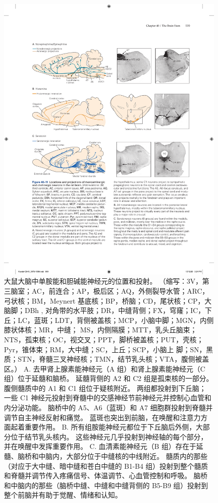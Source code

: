 \begin{figure}[htbp]
	\centering
	\includegraphics[width=0.95\linewidth]{chap40/fig_40_11}
	\caption{大鼠大脑中单胺能和胆碱能神经元的位置和投射。 （缩写：3V，第三脑室；AC，前连合；AP，极后区；AQ，外侧裂导水管；ARC，弓状核；BM，Meynert 基底核；BP，桥脑；CD，尾状核；CP，大脑脚；DBh , 对角带的水平肢；DR，中缝背侧；FX，穹窿；IC，下丘；LC，蓝斑；LDT，背侧被盖核；MCP，小脑中脚；MGN，内侧膝状体核；MR，中缝； MS，内侧隔膜；MTT，乳头丘脑束；NTS，孤束核；OC，视交叉；PPT，脚桥被盖核；PUT，壳核；Pyr，锥体束；RM，大中缝；SC，上丘；SCP，小脑上 脚；SN，黑质；STN，脊髓三叉神经核；TMN，结节乳头核；VTA，腹侧被盖区。） A. 去甲肾上腺素能神经元（A 组）和肾上腺素能神经元（C 组）位于延髓和脑桥。 延髓背侧的 A2 和 C2 组是孤束核的一部分。 腹侧髓质中的 A1 和 C1 组位于疑核附近。 两组都投射到下丘脑； 一些 C1 神经元投射到脊髓中的交感神经节前神经元并控制心血管和内分泌功能。 脑桥中的 A5、A6（蓝斑）和 A7 细胞群投射到脊髓并调节自主神经反射和痛觉。 蓝斑也突出到前脑，在唤醒和注意力方面起着重要作用。 B. 所有组胺能神经元都位于下丘脑后外侧，大部分位于结节乳头核内。 这些神经元几乎投射到神经轴的每个部分，并在唤醒中发挥重要作用。 C. 血清素能神经元（B 组）存在于延髓、脑桥和中脑内，大部分位于中缝核的中线附近。 髓质内的那些（对应于大中缝、暗中缝和苍白中缝的 B1-B4 组）投射到整个髓质和脊髓并调节传入疼痛信号、体温调节、心血管控制和呼吸。 脑桥和中脑内的那些（脑桥中缝、中缝和中缝背侧的 B5-B9 组）投射到整个前脑并有助于觉醒、情绪和认知。}
	\label{fig:40_11}
\end{figure}


